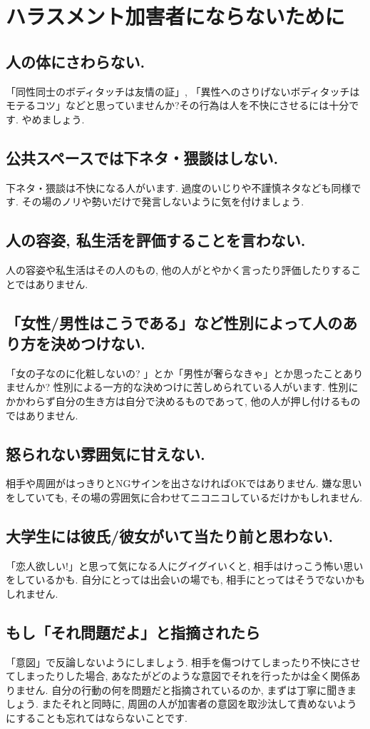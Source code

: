 \section{ハラスメント加害者にならないために}
\label{sec:harassment}

  \subsection{人の体にさわらない. }
  「同性同士のボディタッチは友情の証」, 「異性へのさりげないボディタッチはモテるコツ」などと思っていませんか?その行為は人を不快にさせるには十分です. やめましょう.
  
  \subsection{公共スペースでは下ネタ・猥談はしない. }
  下ネタ・猥談は不快になる人がいます. 過度のいじりや不謹慎ネタなども同様です. その場のノリや勢いだけで発言しないように気を付けましょう. 
  
  \subsection{人の容姿, 私生活を評価することを言わない. }
  人の容姿や私生活はその人のもの, 他の人がとやかく言ったり評価したりすることではありません. 
  
  \subsection{「女性/男性はこうである」など性別によって人のあり方を決めつけない.}
  「女の子なのに化粧しないの? 」とか「男性が奢らなきゃ」とか思ったことありませんか? 性別による一方的な決めつけに苦しめられている人がいます. 性別にかかわらず自分の生き方は自分で決めるものであって, 他の人が押し付けるものではありません. 
  
  \subsection{怒られない雰囲気に甘えない. }
  相手や周囲がはっきりとNGサインを出さなければOKではありません. 嫌な思いをしていても, その場の雰囲気に合わせてニコニコしているだけかもしれません. 
  
  \subsection{大学生には彼氏/彼女がいて当たり前と思わない. }
  「恋人欲しい!」と思って気になる人にグイグイいくと, 相手はけっこう怖い思いをしているかも. 自分にとっては出会いの場でも, 相手にとってはそうでないかもしれません.
  
  \subsection{もし「それ問題だよ」と指摘されたら}
  「意図」で反論しないようにしましょう. 相手を傷つけてしまったり不快にさせてしまったりした場合, あなたがどのような意図でそれを行ったかは全く関係ありません. 自分の行動の何を問題だと指摘されているのか, まずは丁寧に聞きましょう. またそれと同時に, 周囲の人が加害者の意図を取沙汰して責めないようにすることも忘れてはならないことです. 

  